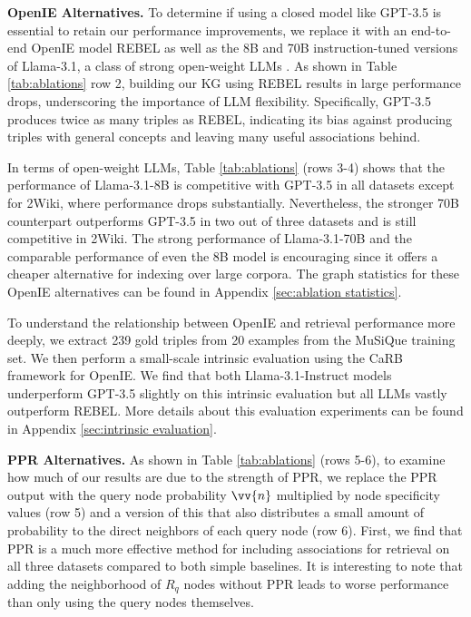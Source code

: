 \documentclass{article}
\begin{document}
\noindent \textbf{OpenIE Alternatives.}
To determine if using a closed model like GPT-3.5 is essential to retain our performance improvements, we replace it with an end-to-end OpenIE model REBEL \cite{rebel} as well as the 8B and 70B instruction-tuned versions of Llama-3.1, a class of strong open-weight LLMs \cite{llama3modelcard}. As shown in Table \ref{tab:ablations} row 2, building our KG using REBEL results in large performance drops, underscoring the importance of LLM flexibility. Specifically, GPT-3.5 produces twice as many triples as REBEL, indicating its bias against producing triples with general concepts and leaving many useful associations behind. 

In terms of open-weight LLMs, Table \ref{tab:ablations} (rows 3-4) shows that the performance of Llama-3.1-8B is competitive with GPT-3.5 in all datasets except for 2Wiki, where performance drops substantially. 
Nevertheless, the stronger 70B counterpart outperforms GPT-3.5 in two out of three datasets and is still competitive in 2Wiki.
The strong performance of Llama-3.1-70B and the comparable performance of even the 8B model is encouraging since it offers a cheaper alternative for indexing over large corpora.
The graph statistics for these OpenIE alternatives can be found in Appendix \ref{sec:ablation statistics}.

To understand the relationship between OpenIE and retrieval performance more deeply, we extract 239 gold triples from 20 examples from the MuSiQue training set. We then perform a small-scale intrinsic evaluation using the CaRB \cite{bhardwaj-etal-2019-carb} framework for OpenIE. We find that both Llama-3.1-Instruct models underperform GPT-3.5 slightly on this intrinsic evaluation but all LLMs vastly outperform REBEL. More details about this evaluation experiments can be found in Appendix \ref{sec:intrinsic evaluation}.

\noindent \textbf{PPR Alternatives.} As shown in Table \ref{tab:ablations} (rows 5-6), to examine how much of our results are due to the strength of PPR, we replace the PPR output with the query node probability $\vv{n}$  multiplied by node specificity values (row 5) and a version of this that also distributes a small amount of probability to the direct neighbors of each query node (row 6).
First, we find that PPR is a much more effective method for including associations for retrieval on all three datasets compared to both simple baselines. 
It is interesting to note that adding the neighborhood of $R_q$ nodes without PPR leads to worse performance than only using the query nodes themselves. 
\end{document}
